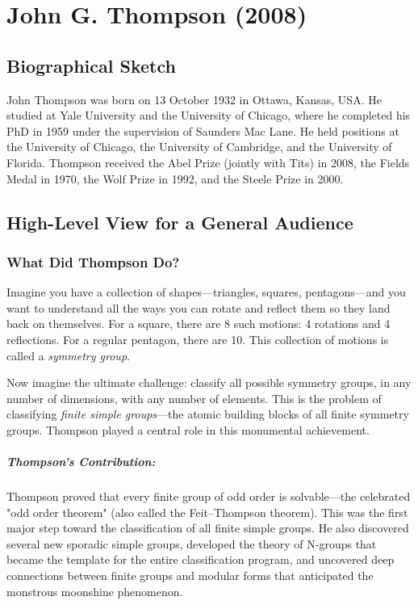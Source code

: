 \chapter{John G. Thompson (2008)}

\section{Biographical Sketch}

John Thompson was born on 13 October 1932 in Ottawa, Kansas, USA. He studied at Yale University and the University of Chicago, where he completed his PhD in 1959 under the supervision of Saunders Mac Lane. He held positions at the University of Chicago, the University of Cambridge, and the University of Florida. Thompson received the Abel Prize (jointly with Tits) in 2008, the Fields Medal in 1970, the Wolf Prize in 1992, and the Steele Prize in 2000.

\section{High-Level View for a General Audience}

\subsection{What Did Thompson Do?}

Imagine you have a collection of shapes---triangles, squares, pentagons---and you want to understand all the ways you can rotate and reflect them so they land back on themselves. For a square, there are 8 such motions: 4 rotations and 4 reflections. For a regular pentagon, there are 10. This collection of motions is called a \emph{symmetry group}.

Now imagine the ultimate challenge: classify all possible symmetry groups, in any number of dimensions, with any number of elements. This is the problem of classifying \emph{finite simple groups}---the atomic building blocks of all finite symmetry groups. Thompson played a central role in this monumental achievement.

\paragraph{Thompson's Contribution:} Thompson proved that every finite group of odd order is solvable---the celebrated "odd order theorem" (also called the Feit--Thompson theorem). This was the first major step toward the classification of all finite simple groups. He also discovered several new sporadic simple groups, developed the theory of N-groups that became the template for the entire classification program, and uncovered deep connections between finite groups and modular forms that anticipated the monstrous moonshine phenomenon.

